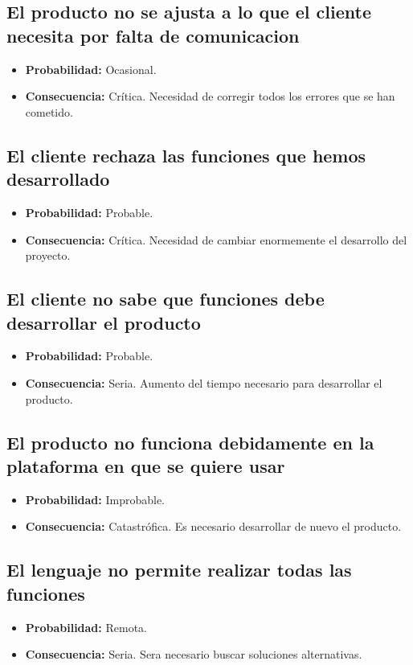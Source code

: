 \documentclass[spanish,a4paper,12pt]{report}	%
\begin{document}
\subsection*{El producto no se ajusta a lo que el cliente necesita por falta de comunicacion}
	\begin{itemize}
		\item \textbf {Probabilidad: }Ocasional.
		\item \textbf {Consecuencia: }Crítica. Necesidad de corregir todos los errores que se han cometido.
	\end{itemize}

\subsection*{El cliente rechaza las funciones que hemos desarrollado}
	\begin{itemize}
		\item \textbf {Probabilidad: }Probable.
		\item \textbf {Consecuencia: }Crítica. Necesidad de cambiar enormemente el desarrollo del proyecto.
	\end{itemize}

\subsection*{El cliente no sabe que funciones debe desarrollar el producto}
	\begin{itemize}
		\item \textbf {Probabilidad: }Probable.
		\item \textbf {Consecuencia: }Seria. Aumento del tiempo necesario para desarrollar el producto.
	\end{itemize}

\subsection*{El producto no funciona debidamente en la plataforma en que se quiere usar}
	\begin{itemize}
		\item \textbf {Probabilidad: }Improbable.
		\item \textbf {Consecuencia: }Catastrófica. Es necesario desarrollar de nuevo el producto.
	\end{itemize}

\subsection*{El lenguaje no permite realizar todas las funciones}
	\begin{itemize}
		\item \textbf {Probabilidad: }Remota.
		\item \textbf {Consecuencia: }Seria. Sera necesario buscar soluciones alternativas.
	\end{itemize}
\end{document}
